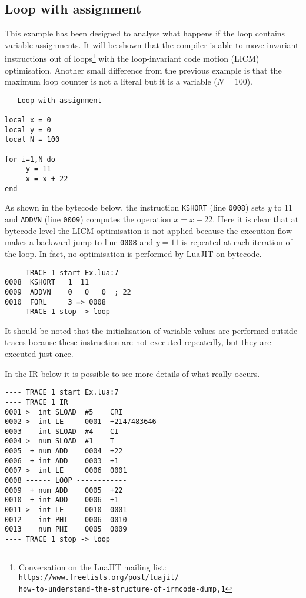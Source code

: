\subsection{Loop with assignment}
This example has been designed to analyse what happens if the loop contains variable assignments. It will be shown that the compiler is able to move invariant instructions out of loops\footnote{Conversation on the LuaJIT mailing list: 
\texttt{https://www.freelists.org/post/luajit/\\how-to-understand-the-structure-of-irmcode-dump,1}} with the loop-invariant code motion (LICM) optimisation. Another small difference from the previous example is that the maximum loop counter is not a literal but it is a variable ($N=100$). 
\begin{mdframed}[style=LuaStyleFrame]
\begin{lstlisting}[style=LuaStyle]
-- Loop with assignment

local x = 0
local y = 0
local N = 100

for i=1,N do
	 y = 11
	 x = x + 22
end
\end{lstlisting}
\end{mdframed}

\noindent
As shown in the bytecode below, the instruction \texttt{KSHORT} (line \texttt{0008}) sets \textit{y} to 11 and \texttt{ADDVN} (line \texttt{0009}) computes the operation $x=x+22$. Here it is clear that at bytecode level the LICM optimisation is not applied because the execution flow makes a backward jump to line \texttt{0008} and $y=11$ is repeated at each iteration of the loop. In fact, no optimisation is performed by LuaJIT on bytecode.

\begin{lstlisting}[style=DumpStyle]
---- TRACE 1 start Ex.lua:7
0008  KSHORT   1  11
0009  ADDVN    0   0   0  ; 22
0010  FORL     3 => 0008
---- TRACE 1 stop -> loop
\end{lstlisting}

\noindent
It should be noted that the initialisation of variable values are performed outside traces because these instruction are not executed repeatedly, but they are executed just once. 

In the IR below it is possible to see more details of what really occurs.

\begin{multicols}{2}
\begin{lstlisting}[style=DumpStyle]
---- TRACE 1 start Ex.lua:7
---- TRACE 1 IR
0001 >  int SLOAD  #5    CRI
0002 >  int LE     0001  +2147483646
0003    int SLOAD  #4    CI
0004 >  num SLOAD  #1    T
0005  + num ADD    0004  +22 
0006  + int ADD    0003  +1  
0007 >  int LE     0006  0001
0008 ------ LOOP ------------
0009  + num ADD    0005  +22 
0010  + int ADD    0006  +1  
0011 >  int LE     0010  0001
0012    int PHI    0006  0010
0013    num PHI    0005  0009
---- TRACE 1 stop -> loop
\end{lstlisting}
\end{multicols} 


